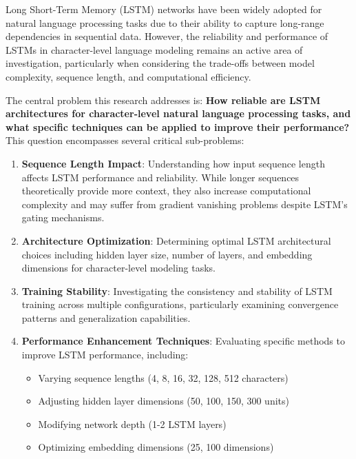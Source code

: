 \documentclass[12pt]{article}
\begin{document}
Long Short-Term Memory (LSTM) networks have been widely adopted for natural language processing tasks due to their ability to capture long-range dependencies in sequential data. However, the reliability and performance of LSTMs in character-level language modeling remains an active area of investigation, particularly when considering the trade-offs between model complexity, sequence length, and computational efficiency.

The central problem this research addresses is: \textbf{How reliable are LSTM architectures for character-level natural language processing tasks, and what specific techniques can be applied to improve their performance?} This question encompasses several critical sub-problems:

\begin{enumerate}
    \item \textbf{Sequence Length Impact}: Understanding how input sequence length affects LSTM performance and reliability. While longer sequences theoretically provide more context, they also increase computational complexity and may suffer from gradient vanishing problems despite LSTM's gating mechanisms.
    
    \item \textbf{Architecture Optimization}: Determining optimal LSTM architectural choices including hidden layer size, number of layers, and embedding dimensions for character-level modeling tasks.
    
    \item \textbf{Training Stability}: Investigating the consistency and stability of LSTM training across multiple configurations, particularly examining convergence patterns and generalization capabilities.
    
    \item \textbf{Performance Enhancement Techniques}: Evaluating specific methods to improve LSTM performance, including:
    \begin{itemize}
        \item Varying sequence lengths (4, 8, 16, 32, 128, 512 characters)
        \item Adjusting hidden layer dimensions (50, 100, 150, 300 units)
        \item Modifying network depth (1-2 LSTM layers)
        \item Optimizing embedding dimensions (25, 100 dimensions)
    \end{itemize}
\end{enumerate}
\end{document}
